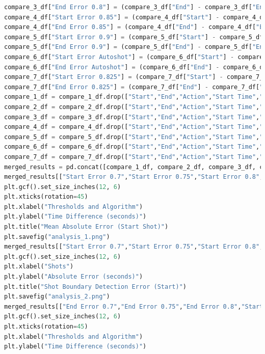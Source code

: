 \documentclass[12pt]{report}
\begin{document}
\begin{lstlisting}[language=Python,caption={Analysis Code}]
compare_3_df["End Error 0.8"] = (compare_3_df["End"] - compare_3_df["End Time"]).abs()
compare_4_df["Start Error 0.85"] = (compare_4_df["Start"] - compare_4_df["Start Time"]).abs()
compare_4_df["End Error 0.85"] = (compare_4_df["End"] - compare_4_df["End Time"]).abs()
compare_5_df["Start Error 0.9"] = (compare_5_df["Start"] - compare_5_df["Start Time"]).abs()
compare_5_df["End Error 0.9"] = (compare_5_df["End"] - compare_5_df["End Time"]).abs()
compare_6_df["Start Error Autoshot"] = (compare_6_df["Start"] - compare_6_df["Start Time"]).abs()
compare_6_df["End Error Autoshot"] = (compare_6_df["End"] - compare_6_df["End Time"]).abs()
compare_7_df["Start Error 0.825"] = (compare_7_df["Start"] - compare_7_df["Start Time"]).abs()
compare_7_df["End Error 0.825"] = (compare_7_df["End"] - compare_7_df["End Time"]).abs()
compare_1_df = compare_1_df.drop(["Start","End","Action","Start Time","End Time"], axis=1)
compare_2_df = compare_2_df.drop(["Start","End","Action","Start Time","End Time"], axis=1)
compare_3_df = compare_3_df.drop(["Start","End","Action","Start Time","End Time"], axis=1)
compare_4_df = compare_4_df.drop(["Start","End","Action","Start Time","End Time"], axis=1)
compare_5_df = compare_5_df.drop(["Start","End","Action","Start Time","End Time"], axis=1)
compare_6_df = compare_6_df.drop(["Start","End","Action","Start Time","End Time"], axis=1)
compare_7_df = compare_7_df.drop(["Start","End","Action","Start Time","End Time"], axis=1)
merged_results = pd.concat([compare_1_df, compare_2_df, compare_3_df, compare_4_df,compare_5_df,compare_6_df,compare_7_df], axis=1)
merged_results[["Start Error 0.7","Start Error 0.75","Start Error 0.8","Start Error 0.825","Start Error 0.85","Start Error 0.9","Start Error Autoshot"]].plot(kind="box")
plt.gcf().set_size_inches(12, 6)
plt.xticks(rotation=45)
plt.xlabel("Thresholds and Algorithm")
plt.ylabel("Time Difference (seconds)")
plt.title("Mean Absolute Error (Start Shot)")
plt.savefig("analysis_1.png")
merged_results[["Start Error 0.7","Start Error 0.75","Start Error 0.8","Start Error 0.825","Start Error 0.85","Start Error 0.9","Start Error Autoshot"]].plot(kind="line")
plt.gcf().set_size_inches(12, 6)
plt.xlabel("Shots")
plt.ylabel("Absolute Error (seconds)")
plt.title("Shot Boundary Detection Error (Start)")
plt.savefig("analysis_2.png")
merged_results[["End Error 0.7","End Error 0.75","End Error 0.8","Start Error 0.825","End Error 0.85","End Error 0.9","End Error Autoshot"]].plot(kind="box")
plt.gcf().set_size_inches(12, 6)
plt.xticks(rotation=45)
plt.xlabel("Thresholds and Algorithm")
plt.ylabel("Time Difference (seconds)")

\end{lstlisting}
\end{document}
